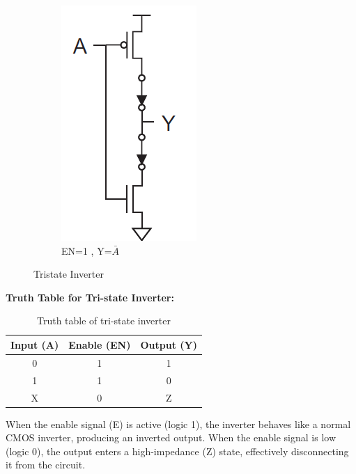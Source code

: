 \documentclass[a4paper,12pt]{article}
\begin{document}
\begin{figure}[H]
\begin{subfigure}[t]{0.3\textwidth}
		\includegraphics[width=.75\linewidth]{images/t/ti3}
		\caption{EN=1 , Y=$\bar{A}$}
	\end{subfigure}
	\caption{Tristate Inverter }
\end{figure}
\textbf{Truth Table for Tri-state Inverter:}

\begin{table}[h!]
	\centering
	\begin{tabular}{|c|c|c|}
		\hline
		\textbf{Input (A)} & \textbf{Enable (EN)} & \textbf{Output (Y)} \\
		\hline
		0 & 1 & 1 \\
		1 & 1 & 0 \\
		X & 0 & Z \\
		\hline
	\end{tabular}
	\caption{Truth table of tri-state inverter}
\end{table}

When the enable signal (E) is active (logic 1), the inverter behaves like a normal CMOS inverter, producing an inverted output. When the enable signal is low (logic 0), the output enters a high-impedance (Z) state, effectively disconnecting it from the circuit.
\newpage
\end{document}
